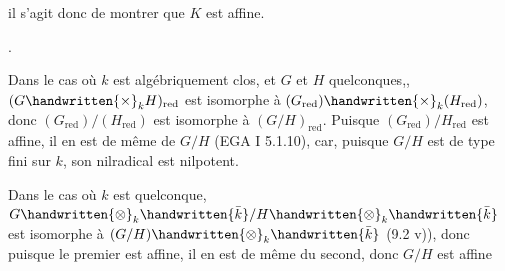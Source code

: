 
il s'agit donc de montrer que $K$ est affine.

\deleted{\unsure{)}}.

Dans le cas où $k$ est algébriquement clos, et $G$ et $H$ quelconques,, $(G\handwritten{\times}_k H)_{\mathrm{red}}$ est isomorphe à $(G_{\mathrm{red}})\handwritten{\times}_k(H_{\mathrm{red}})$, donc $(G_{\mathrm{red}})/(H_{\mathrm{red}})$ est isomorphe à $(G/H)_{\mathrm{red}}$. Puisque $(G_{\mathrm{red}})/H_{\mathrm{red}}$ est affine, il en est de même de $G/H$ (EGA I 5.1.10), car, puisque $G/H$ est de type fini sur $k$, son nilradical est nilpotent.

Dans le cas où $k$ est quelconque, $G\handwritten{\otimes}_k\handwritten{\bar{k}}/H\handwritten{\otimes}_k\handwritten{\bar{k}}$ est isomorphe à $(G/H)\handwritten{\otimes}_k\handwritten{\bar{k}}$ (9.2 v)), donc puisque le premier est affine, il en est de même du second, donc $G/H$ est affine
\margin{\handwritten{(\qquad)}}

